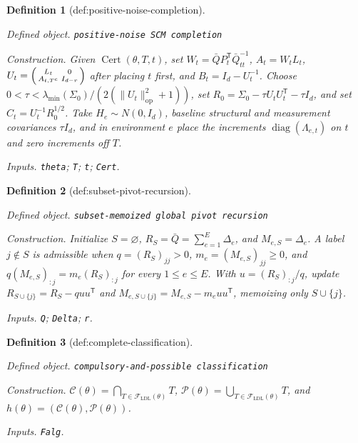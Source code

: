 \documentclass{article}
\newtheorem{definition}{Definition}
\begin{document}
\begin{definition}[def:positive-noise-completion]\label{def:positive-noise-completion}
\par\smallskip\noindent\emph{Defined object.} \texttt{positive-\allowbreak{}noise SCM completion}
\par\smallskip\noindent\emph{Construction.} Given \(\operatorname{Cert}(\theta,T,t)\), set \(W_t=\bar QP_t^{\mathsf T}\bar Q_{tt}^{-1}\), \(A_t=W_tL_t\), \(U_t=\begin{psmallmatrix}L_t&0\\A_{t,T^c}&I_{d-r}\end{psmallmatrix}\) after placing \(t\) first, and \(B_t=I_d-U_t^{-1}\).  Choose \(0<\tau<\lambda_{\min}(\Sigma_0)/(2(\lVert U_t\rVert_{\mathrm{op}}^2+1))\), set \(R_0=\Sigma_0-\tau U_tU_t^{\mathsf T}-\tau I_d\), and set \(C_t=U_t^{-1}R_0^{1/2}\).  Take \(H_e\sim N(0,I_d)\), baseline structural and measurement covariances \(\tau I_d\), and in environment \(e\) place the increments \(\operatorname{diag}(\Lambda_{e,t})\) on \(t\) and zero increments off \(T\).
\par\smallskip\noindent\emph{Inputs.} \texttt{theta}; \texttt{T}; \texttt{t}; \texttt{Cert}.
\end{definition}

\begin{definition}[def:subset-pivot-recursion]\label{def:subset-pivot-recursion}
\par\smallskip\noindent\emph{Defined object.} \texttt{subset-\allowbreak{}memoized global pivot recursion}
\par\smallskip\noindent\emph{Construction.} Initialize \(S=\varnothing\), \(R_S=\bar Q=\sum_{e=1}^E\Delta_e\), and \(M_{e,S}=\Delta_e\).  A label \(j\notin S\) is admissible when \(q=(R_S)_{jj}>0\), \(m_e=(M_{e,S})_{jj}\ge0\), and \(q(M_{e,S})_{:j}=m_e(R_S)_{:j}\) for every \(1\le e\le E\).  With \(u=(R_S)_{:j}/q\), update \(R_{S\cup\{j\}}=R_S-quu^{\mathsf T}\) and \(M_{e,S\cup\{j\}}=M_{e,S}-m_euu^{\mathsf T}\), memoizing only \(S\cup\{j\}\).
\par\smallskip\noindent\emph{Inputs.} \texttt{Q}; \texttt{Delta}; \texttt{r}.
\end{definition}

\begin{definition}[def:complete-classification]\label{def:complete-classification}
\par\smallskip\noindent\emph{Defined object.} \texttt{compulsory-\allowbreak{}and-\allowbreak{}possible classification}
\par\smallskip\noindent\emph{Construction.} \(\mathcal C(\theta)=\bigcap_{T\in\mathcal F_{\mathrm{LDL}}(\theta)}T\), \(\mathcal P(\theta)=\bigcup_{T\in\mathcal F_{\mathrm{LDL}}(\theta)}T\), and \(h(\theta)=(\mathcal C(\theta),\mathcal P(\theta))\).
\par\smallskip\noindent\emph{Inputs.} \texttt{Falg}.
\end{definition}
\end{document}
